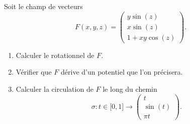 
\begin{exercice}\label{exoOutilsMath-0148}

    Soit le champ de vecteurs
    \begin{equation}
        F(x,y,z)=\begin{pmatrix}
             y\sin(z)   \\ 
            x\sin(z)    \\ 
            1+xy\cos(z)    
        \end{pmatrix}.
    \end{equation}
    \begin{enumerate}
        \item
            Calculer le rotationnel de \( F\).
        \item
            Vérifier que \( F\) dérive d'un potentiel que l'on précisera.
        \item
            Calculer la circulation de \( F\) le long du chemin
            \begin{equation}
                \sigma\colon t\in\mathopen[ 0 , 1 \mathclose]\to \begin{pmatrix}
                    t    \\ 
                    \sin(t)    \\ 
                    \pi t    
                \end{pmatrix}.
            \end{equation}
    \end{enumerate}

\end{exercice}

